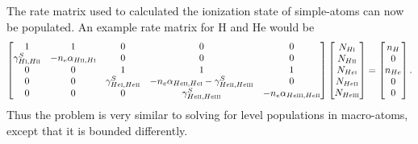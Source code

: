 The rate matrix used to calculated the ionization state of simple-atoms
can now be populated. An example rate matrix for H and He would be
\begin{equation}
\begin{bmatrix}
    1  & 1 & 0 & 0 & 0 \\
    \gamma_{H\textsc{i},H\textsc{ii}}^S & -n_e \alpha_{H\textsc{ii},H\textsc{i}} & 0 & 0 & 0 \\
     0 & 0 & 1 & 1 & 1 \\
     0 & 0 & \gamma_{He\textsc{i},He\textsc{ii}}^S & -n_e \alpha_{He\textsc{ii},He\textsc{i}} - \gamma_{He\textsc{ii},He\textsc{iii}}^S & 0\\
     0 & 0 & 0 & \gamma_{He\textsc{ii},He\textsc{iii}}^S & -n_e \alpha_{He\textsc{iii},He\textsc{ii}}
\end{bmatrix}
\begin{bmatrix}
    N_{H\textsc{i}} \\
    N_{H\textsc{ii}} \\
    N_{He\textsc{i}} \\
    N_{He\textsc{ii}} \\
    N_{He\textsc{iii}} 
\end{bmatrix}
=
\begin{bmatrix}
    n_H \\
    0 \\
    n_{He} \\  
    0 \\
    0
\end{bmatrix}
.
\end{equation}
Thus the problem is very similar to solving for level populations in macro-atoms, except that
it is bounded differently.


